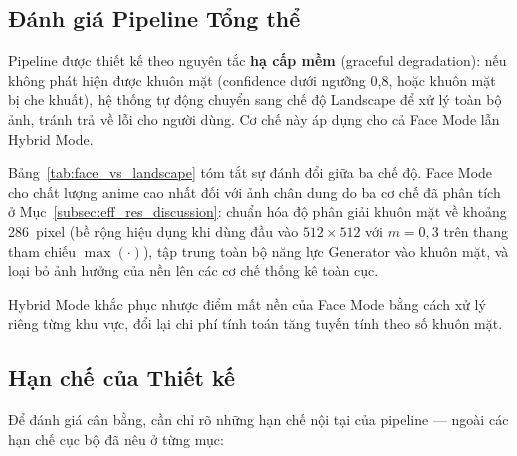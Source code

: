\subsection{Đánh giá Pipeline Tổng thể}
\label{subsec:pipeline_evaluation}

Pipeline được thiết kế theo nguyên tắc \textbf{hạ cấp mềm} (graceful degradation): nếu không phát hiện được khuôn mặt (confidence dưới ngưỡng 0,8, hoặc khuôn mặt bị che khuất), hệ thống tự động chuyển sang chế độ Landscape để xử lý toàn bộ ảnh, tránh trả về lỗi cho người dùng. Cơ chế này áp dụng cho cả Face Mode lẫn Hybrid Mode.

Bảng~\ref{tab:face_vs_landscape} tóm tắt sự đánh đổi giữa ba chế độ. Face Mode cho chất lượng anime cao nhất đối với ảnh chân dung do ba cơ chế đã phân tích ở Mục~\ref{subsec:eff_res_discussion}: chuẩn hóa độ phân giải khuôn mặt về khoảng 286~pixel (bề rộng hiệu dụng khi dùng đầu vào $512\times512$ với $m = 0{,}3$ trên thang tham chiếu $\max(\cdot)$), tập trung toàn bộ năng lực Generator vào khuôn mặt, và loại bỏ ảnh hưởng của nền lên các cơ chế thống kê toàn cục.

Hybrid Mode khắc phục nhược điểm mất nền của Face Mode bằng cách xử lý riêng từng khu vực, đổi lại chi phí tính toán tăng tuyến tính theo số khuôn mặt.

\subsection{Hạn chế của Thiết kế}
\label{subsec:pipeline_limitations}

Để đánh giá cân bằng, cần chỉ rõ những hạn chế nội tại của pipeline --- ngoài các hạn chế cục bộ đã nêu ở từng mục:

